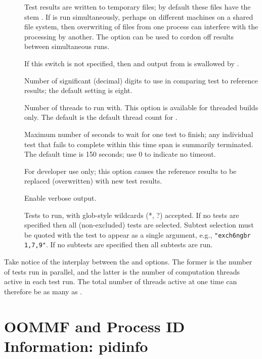 \begin{description}
\item[]
  Test results are written to temporary files; by default these files
  have the stem .  If 
  is run simultaneously, perhaps on different machines on a shared
  file system, then overwriting of files from one process can
  interfere with the processing by another.  The 
  option can be used to cordon off results between simultaneous runs.
\item[]
  If this switch is not specified, then  and 
  output from  is swallowed by .
\item[]
 Number of significant (decimal) digits to use in comparing test to
 reference results; the default setting is eight.
\item[]
 Number of threads to run  with.  This option is available
 for threaded builds only.  The default is the default thread count
 for .
\item[]
 Maximum number of seconds to wait for one test to finish; any
 individual test that fails to complete within this time span is summarily
 terminated.  The default time is 150 seconds; use 0 to indicate no timeout.
\item[]
 For developer use only; this option causes the reference results to
 be replaced (overwritten) with new test results.
\item[]
 Enable verbose output.
\item[]
 Tests to run, with glob-style wildcards (*, ?) accepted.  If no tests
 are specified then all (non-excluded) tests are selected.  Subtest
 selection must be quoted with the test to appear as a single
 argument, e.g., \verb+"exch6ngbr 1,7,9"+.  If no subtests are
 specified then all subtests are run.
\end{description}
Take notice  of the interplay between the  and
 options. The former is the number of tests run in
parallel, and the latter is the number of computation threads active in
each test run. The total number of threads active at one time can
therefore be as many as .


\section{OOMMF and Process ID Information: pidinfo\label{sec:pidinfo}}%

